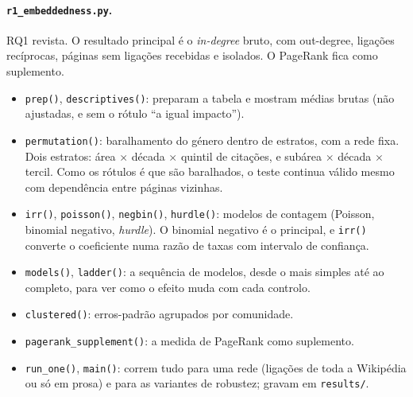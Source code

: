 \documentclass[11pt,a4paper]{article}
\newcommand{\file}[1]{\texttt{#1}}
\newcommand{\fn}[1]{\texttt{#1()}}
\begin{document}
\paragraph{\file{r1_embeddedness.py}.} RQ1 revista. O resultado principal é o \emph{in-degree} bruto, com out-degree, ligações recíprocas, páginas sem ligações recebidas e isolados. O PageRank fica como suplemento.
\begin{itemize}
  \item \fn{prep}, \fn{descriptives}: preparam a tabela e mostram médias brutas (não ajustadas, e sem o rótulo ``a igual impacto'').
  \item \fn{permutation}: baralhamento do género dentro de estratos, com a rede fixa. Dois estratos: área $\times$ década $\times$ quintil de citações, e subárea $\times$ década $\times$ tercil. Como os rótulos é que são baralhados, o teste continua válido mesmo com dependência entre páginas vizinhas.
  \item \fn{irr}, \fn{poisson}, \fn{negbin}, \fn{hurdle}: modelos de contagem (Poisson, binomial negativo, \emph{hurdle}). O binomial negativo é o principal, e \fn{irr} converte o coeficiente numa razão de taxas com intervalo de confiança.
  \item \fn{models}, \fn{ladder}: a sequência de modelos, desde o mais simples até ao completo, para ver como o efeito muda com cada controlo.
  \item \fn{clustered}: erros-padrão agrupados por comunidade.
  \item \fn{pagerank_supplement}: a medida de PageRank como suplemento.
  \item \fn{run_one}, \fn{main}: correm tudo para uma rede (ligações de toda a Wikipédia ou só em prosa) e para as variantes de robustez; gravam em \file{results/}.
\end{itemize}
\end{document}
